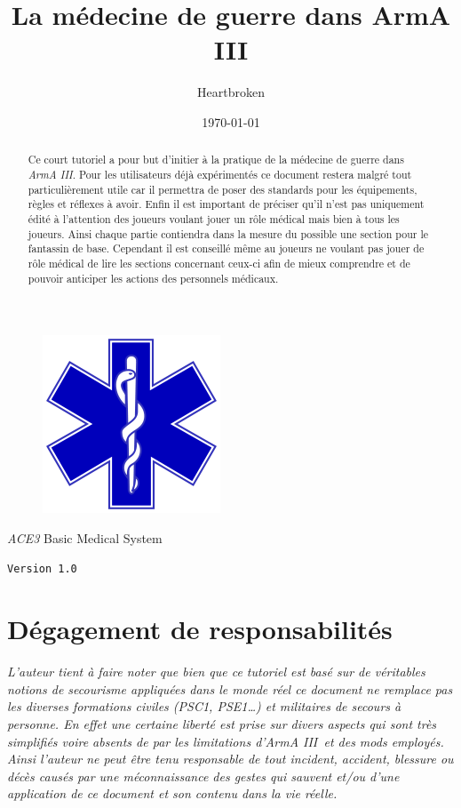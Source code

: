 \documentclass{article}
\title{La médecine de guerre dans ArmA III}
\author{Heartbroken}
\date{\today}
\newcommand{\arma}{\emph{ArmA III}}
\newcommand{\version}{\texttt{Version 1.0}}
\newcommand{\medsys}{\emph{ACE3} Basic Medical System}
\begin{document}
	
	\maketitle
	
	\begin{figure}[h]
		\centerline{\includegraphics{Star_of_life2}}
	\end{figure}
	
	\begin{abstract}
		
		Ce court tutoriel a pour but d'initier à la pratique de la médecine de guerre dans \arma. Pour les utilisateurs déjà expérimentés ce document restera malgré tout particulièrement utile car il permettra de poser des standards pour les équipements, règles et réflexes à avoir. Enfin il est important de préciser qu'il n'est pas uniquement édité à l'attention des joueurs voulant jouer un rôle médical mais bien à tous les joueurs. Ainsi chaque partie contiendra dans la mesure du possible une section pour le fantassin de base. Cependant il est conseillé même au joueurs ne voulant pas jouer de rôle médical de lire les sections concernant ceux-ci afin de mieux comprendre et de pouvoir anticiper les actions des personnels médicaux.
		
	\end{abstract}
	
		\begin{center}
			
			\medsys
			
			\version
			
		\end{center}
	
	\newpage
	
	\part{Dégagement de responsabilités}
		\emph{L'auteur tient à faire noter que bien que ce tutoriel est basé sur de véritables notions de secourisme appliquées dans le monde réel ce document ne remplace pas les diverses formations civiles (\emph{PSC1, PSE1}\dots) et militaires de secours à personne. En effet une certaine liberté est prise sur divers aspects qui sont très simplifiés voire absents de par les limitations d'\arma\ et des mods employés. Ainsi l'auteur ne peut être tenu responsable de tout incident, accident, blessure ou décès causés par une méconnaissance des gestes qui sauvent et/ou d'une application de ce document et son contenu dans la vie réelle.}
		
\end{document}
